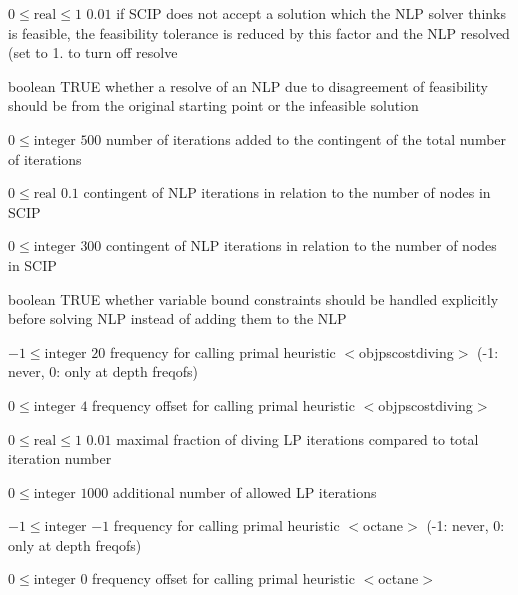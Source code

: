 %
{$0\leq\textrm{real}\leq1$}%
{$0.01$}%
{if SCIP does not accept a solution which the NLP solver thinks is feasible, the feasibility tolerance is reduced by this factor and the NLP resolved (set to 1. to turn off resolve}%
{}

%
{boolean}%
{TRUE}%
{whether a resolve of an NLP due to disagreement of feasibility should be from the original starting point or the infeasible solution}%
{}

%
{$0\leq\textrm{integer}$}%
{$500$}%
{number of iterations added to the contingent of the total number of iterations}%
{}

%
{$0\leq\textrm{real}$}%
{$0.1$}%
{contingent of NLP iterations in relation to the number of nodes in SCIP}%
{}

%
{$0\leq\textrm{integer}$}%
{$300$}%
{contingent of NLP iterations in relation to the number of nodes in SCIP}%
{}

%
{boolean}%
{TRUE}%
{whether variable bound constraints should be handled explicitly before solving NLP instead of adding them to the NLP}%
{}

%
{$-1\leq\textrm{integer}$}%
{$20$}%
{frequency for calling primal heuristic $<$objpscostdiving$>$ (-1: never, 0: only at depth freqofs)}%
{}

%
{$0\leq\textrm{integer}$}%
{$4$}%
{frequency offset for calling primal heuristic $<$objpscostdiving$>$}%
{}

%
{$0\leq\textrm{real}\leq1$}%
{$0.01$}%
{maximal fraction of diving LP iterations compared to total iteration number}%
{}

%
{$0\leq\textrm{integer}$}%
{$1000$}%
{additional number of allowed LP iterations}%
{}

%
{$-1\leq\textrm{integer}$}%
{$-1$}%
{frequency for calling primal heuristic $<$octane$>$ (-1: never, 0: only at depth freqofs)}%
{}

%
{$0\leq\textrm{integer}$}%
{$0$}%
{frequency offset for calling primal heuristic $<$octane$>$}%
{}

